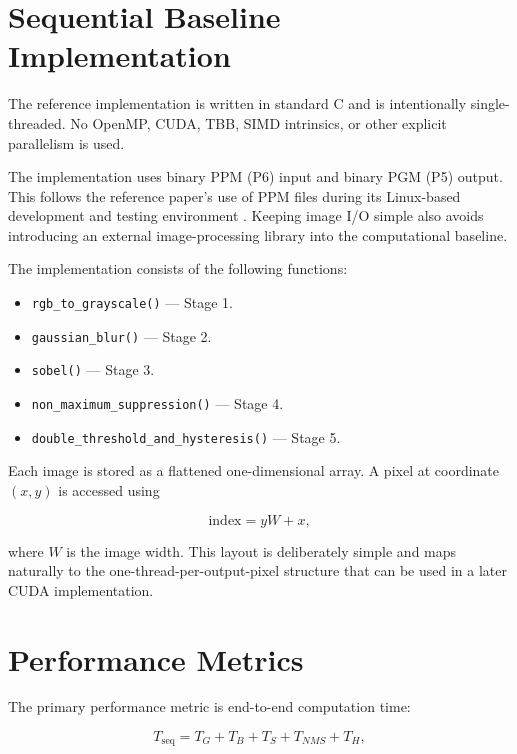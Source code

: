 \documentclass[conference]{IEEEtran}
\begin{document}
\section{Sequential Baseline Implementation}

The reference implementation is written in standard C and is intentionally
single-threaded. No OpenMP, CUDA, TBB, SIMD intrinsics, or other explicit
parallelism is used.

The implementation uses binary PPM (P6) input and binary PGM (P5) output.
This follows the reference paper's use of PPM files during its Linux-based
development and testing environment \cite{horvath2023}. Keeping image I/O
simple also avoids introducing an external image-processing library into
the computational baseline.

The implementation consists of the following functions:

\begin{itemize}
    \item \texttt{rgb\_to\_grayscale()} --- Stage 1.
    \item \texttt{gaussian\_blur()} --- Stage 2.
    \item \texttt{sobel()} --- Stage 3.
    \item \texttt{non\_maximum\_suppression()} --- Stage 4.
    \item \texttt{double\_threshold\_and\_hysteresis()} --- Stage 5.
\end{itemize}

Each image is stored as a flattened one-dimensional array. A pixel at
coordinate $(x,y)$ is accessed using

\begin{equation}
\mathrm{index}=yW+x,
\end{equation}

where $W$ is the image width. This layout is deliberately simple and maps
naturally to the one-thread-per-output-pixel structure that can be used in
a later CUDA implementation.

\section{Performance Metrics}

The primary performance metric is end-to-end computation time:

\begin{equation}
T_{\mathrm{seq}} =
T_G+T_B+T_S+T_{NMS}+T_H,
\end{equation}
\end{document}
